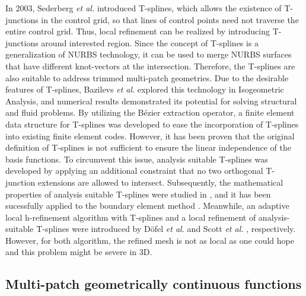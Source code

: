 \documentclass[preprint,12pt]{elsarticle}
\theoremstyle{remark}
\begin{document}
In 2003, Sederberg \textit{et al.} \cite{sederberg_t-splines_2003} introduced T-splines, which allows the existence of T-junctions in the control grid, so that lines of control points need not traverse the entire control grid. Thus, local refinement can be realized by introducing T-junctions around interested region. Since the concept of T-splines is a generalization of NURBS technology, it can be used to merge NURBS surfaces that have different knot-vectors at the intersection. Therefore, the T-splines are also suitable to address trimmed multi-patch geometries. Due to the desirable features of T-splines, Bazilevs \textit{et al.} \cite{bazilevs_isogeometric_2010} explored this technology in Isogeometric Analysis, and numerical results demonstrated its potential for solving structural and fluid problems. By utilizing the B\'ezier extraction operator, a finite element data structure for T-splines \cite{scott_isogeometric_2011} was developed to ease the incorporation of T-splines into existing finite element codes. However, it has been proven \cite{buffa_linear_2010} that the original definition of T-splines is not sufficient to ensure the linear independence of the basis functions. To circumvent this issue, analysis suitable T-splines \cite{li_linear_2012} was developed by applying an additional constraint that no two orthogonal T-junction extensions are allowed to intersect. Subsequently, the mathematical properties of analysis suitable T-splines were studied in \cite{li_analysis-suitable_2013,xin_li_properties_2015}, and it has been sucessfully applied to the boundary element method \cite{scott_isogeometric_2013}. Meanwhile, an adaptive local h-refinement algorithm with T-splines and a local refinement of analysis-suitable T-splines were introduced by D\"{o}fel \textit{et al.} \cite{dorfel_adaptive_2010} and Scott \textit{et al.} \cite{scott_local_2012}, respectively. However, for both algorithm, the refined mesh is not as local as one could hope and this problem might be severe in 3D.\par

\subsection{Multi-patch geometrically continuous functions}
\end{document}

